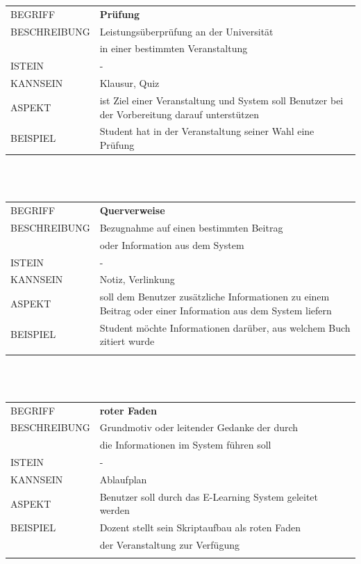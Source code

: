 \documentclass[12pt,a4paper]{article}
\begin{document}
\begin{tabular}{l p{12cm}}
BEGRIFF 	 & \textbf{Prüfung} \\ 
BESCHREIBUNG & Leistungsüberprüfung an der Universität\\
			 & in einer bestimmten Veranstaltung\\ 
ISTEIN   	 & - \\
KANNSEIN 	 & Klausur, Quiz\\ 
ASPEKT   	 & ist Ziel einer Veranstaltung und System soll Benutzer bei der Vorbereitung darauf unterstützen\\
BEISPIEL 	 & Student hat in der Veranstaltung seiner Wahl eine Prüfung\\
\hline
\end{tabular}\\\\  

\begin{tabular}{l p{12cm}}
BEGRIFF 	 & \textbf{Querverweise} \\ 
BESCHREIBUNG & Bezugnahme auf einen bestimmten Beitrag\\
			 & oder Information aus dem System\\ 
ISTEIN   	 & - \\
KANNSEIN 	 & Notiz, Verlinkung\\ 
ASPEKT   	 & soll dem Benutzer zusätzliche Informationen zu einem Beitrag 				   oder einer Information aus dem System liefern\\
BEISPIEL 	 & Student möchte Informationen darüber, aus welchem Buch zitiert wurde\\\\
\hline
\end{tabular}\\\\  

\begin{tabular}{l p{12cm}}
BEGRIFF 	 & \textbf{roter Faden} \\ 
BESCHREIBUNG & Grundmotiv oder leitender Gedanke der durch\\
			 &  die Informationen im System führen soll\\ 
ISTEIN   	 & - \\
KANNSEIN 	 & Ablaufplan \\ 
ASPEKT   	 & Benutzer soll durch das E-Learning System geleitet werden\\
BEISPIEL 	 & Dozent stellt sein Skriptaufbau als roten Faden\\
			 & der Veranstaltung zur Verfügung\\\\
\hline
\end{tabular}\\\\  
\end{document}
